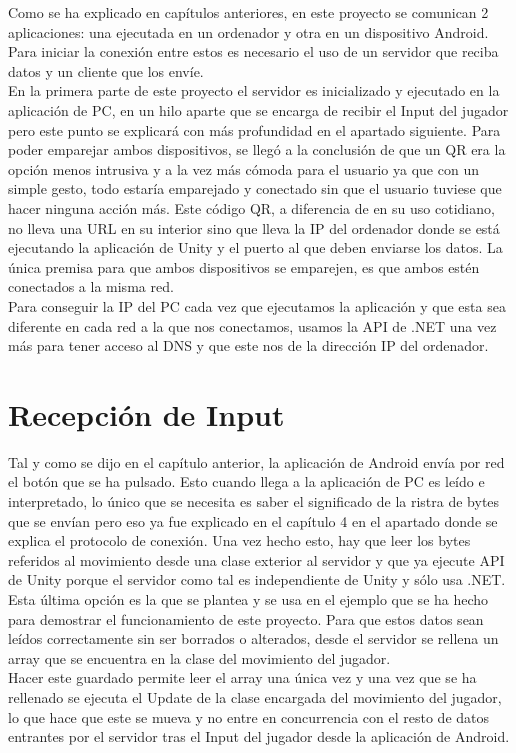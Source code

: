 Como se ha explicado en cap\'itulos anteriores, en este proyecto se comunican 2 aplicaciones: una ejecutada en un ordenador y otra en un dispositivo Android. Para iniciar la conexi\'on entre estos es necesario el uso de un servidor que reciba datos y un cliente que los env\'ie.
\\
 En la primera parte de este proyecto el servidor es inicializado y ejecutado en la aplicaci\'on de PC, en un hilo aparte que se encarga de recibir el Input del jugador pero este punto se explicar\'a con m\'as profundidad en el apartado siguiente. Para poder emparejar ambos dispositivos, se lleg\'o a la conclusi\'on de que un QR era la opci\'on menos intrusiva y a la vez m\'as c\'omoda para el usuario ya que con un simple gesto, todo estar\'ia emparejado y conectado sin que el usuario tuviese que hacer ninguna acci\'on m\'as. Este c\'odigo QR, a diferencia de en su uso cotidiano, no lleva una URL en su interior sino que lleva la IP del ordenador donde se est\'a ejecutando la aplicaci\'on de Unity y el puerto al que deben enviarse los datos. La \'unica premisa para que ambos dispositivos se emparejen, es que ambos est\'en conectados a la misma red. 
\\
Para conseguir la IP del PC cada vez que ejecutamos la aplicaci\'on y que esta sea diferente en cada red a la que nos conectamos, usamos la API de .NET una vez m\'as para tener acceso al DNS y que este nos de la direcci\'on IP del ordenador. 

\section{Recepci\'on de Input}
\label{cap6:sec:input}

Tal y como se dijo en el cap\'itulo anterior, la aplicaci\'on de Android env\'ia por red el bot\'on que se ha pulsado. Esto cuando llega a la aplicaci\'on de PC es le\'ido e interpretado, lo \'unico que se necesita es saber el significado de la ristra de bytes que se env\'ian pero eso ya fue explicado en el cap\'itulo 4 en el apartado donde se explica el protocolo de conexi\'on. Una vez hecho esto, hay que leer los bytes referidos al movimiento desde una clase exterior al servidor y que ya ejecute API de Unity porque el servidor como tal es independiente de Unity y s\'olo usa .NET.
\\
 Esta \'ultima opci\'on es la que se plantea y se usa en el ejemplo que se ha hecho para demostrar el funcionamiento de este proyecto.
Para que estos datos sean le\'idos correctamente sin ser borrados o alterados, desde el servidor se rellena un array que se encuentra en la clase del movimiento del jugador.
\\
 Hacer este guardado permite leer el array una \'unica vez y una vez que se ha rellenado se ejecuta el Update de la clase encargada del movimiento del jugador, lo que hace que este se mueva y no entre en concurrencia con el resto de datos entrantes por el servidor tras el Input del jugador desde la aplicaci\'on de Android.
